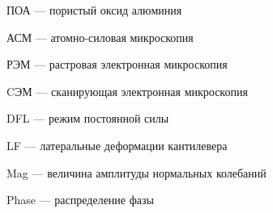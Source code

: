 
\hypertarget{dc}{ПОА --- пористый оксид алюминия}

\hypertarget{dc}{АСМ --- атомно-силовая микроскопия}

\hypertarget{dc}{РЭМ --- растровая электронная микроскопия}

\hypertarget{dc}{CЭМ --- сканирующая электронная микроскопия}

\hypertarget{dc}{DFL --- режим постоянной силы}

\hypertarget{dc}{LF --- латеральные деформации кантилевера}

\hypertarget{dc}{Mag --- величина амплитуды нормальных колебаний}

\hypertarget{dc}{Phase --- распределение фазы}

\clearpage
